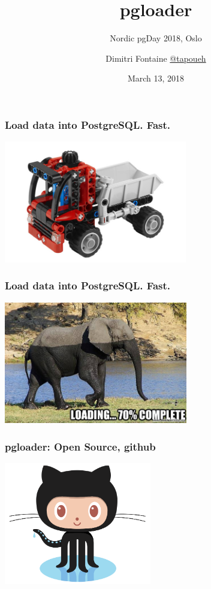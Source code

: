 \documentclass{beamer}
\title{pgloader}
\subtitle{Nordic pgDay 2018, Oslo}
\author{Dimitri Fontaine \linebreak \url{@tapoueh}}
\date{March 13, 2018}
\begin{document}
\frame{\titlepage}

\begin{frame}
  \frametitle{Load data into PostgreSQL. Fast.}


  \begin{center}
    \includegraphics[height=2.1in]{pgloader.jpg}
  \end{center}
\end{frame}

\begin{frame}
  \frametitle{Load data into PostgreSQL. Fast.}


  \begin{center}
    \includegraphics[height=2.1in]{elephant-loading.jpg}
  \end{center}
\end{frame}

\begin{frame}
  \frametitle{pgloader: Open Source, github}


  \begin{center}
    \includegraphics[height=2.1in]{Octocat.png}
  \end{center}
\end{frame}
\end{document}
